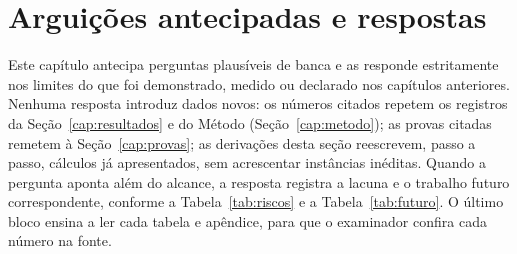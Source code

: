 \chapter{Arguições antecipadas e respostas}\label{cap:arguicoes}
Este capítulo antecipa perguntas plausíveis de banca e as responde estritamente nos limites do que foi demonstrado, medido ou declarado nos capítulos anteriores. Nenhuma resposta introduz dados novos: os números citados repetem os registros da Seção~\ref{cap:resultados} e do Método (Seção~\ref{cap:metodo}); as provas citadas remetem à Seção~\ref{cap:provas}; as derivações desta seção reescrevem, passo a passo, cálculos já apresentados, sem acrescentar instâncias inéditas. Quando a pergunta aponta além do alcance, a resposta registra a lacuna e o trabalho futuro correspondente, conforme a Tabela~\ref{tab:riscos} e a Tabela~\ref{tab:futuro}. O último bloco ensina a ler cada tabela e apêndice, para que o examinador confira cada número na fonte.
